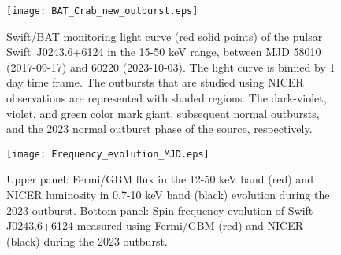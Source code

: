 \documentclass[twocolumn,trackchanges]{aastex631}
\begin{document}
\begin{figure*}
    
    \centering
    \texttt{[image: BAT\_Crab\_new\_outburst.eps]}
    \caption{Swift/BAT monitoring light curve (red solid points) of the pulsar Swift~J0243.6+6124 in the 15-50 keV range, between MJD 58010 (2017-09-17) and 60220 (2023-10-03). The light curve is binned by 1 day time frame.  The outbursts that are studied using NICER observations are represented with shaded regions. The dark-violet, violet, and green color mark giant, subsequent normal outbursts, and the 2023 normal outburst phase of the source, respectively.} 
    \label{fig:Swiftlcurve}
\end{figure*}




\begin{figure}
   
    \centering
    \texttt{[image: Frequency\_evolution\_MJD.eps]}
    \caption{Upper panel: Fermi/GBM flux in the 12-50 keV band (red) and NICER luminosity in 0.7-10 keV band (black) evolution during the 2023 outburst. Bottom panel: Spin frequency evolution of Swift J0243.6+6124 measured using Fermi/GBM (red) and NICER (black) during the 2023 outburst.} 
    \label{fig:spin_evol}
\end{figure}
\end{document}
